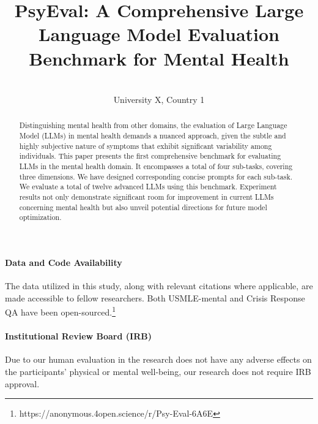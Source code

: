 \documentclass[pmlr,twocolumn,10pt]{jmlr} %
\title[PsyEval]{PsyEval: A Comprehensive Large Language Model\titlebreak
Evaluation Benchmark for Mental Health}
\author{
\Name{Anonymous First Author 1}\Email{abc@sample.com}\\
\addr University X, Country 1
}
\newcommand{\MY}[1]{\textcolor{blue}{(Mengyue: #1)}}
\begin{document}
\maketitle

\begin{abstract}
Distinguishing mental health from other domains, the evaluation of Large Language Model (LLMs) in mental health demands a nuanced approach, given the subtle and highly subjective nature of symptoms that exhibit significant variability among individuals. This paper presents the first comprehensive benchmark for evaluating LLMs in the mental health domain. 
It encompasses a total of four sub-tasks, covering three dimensions.
We have designed corresponding concise prompts for each sub-task. 
We evaluate a total of twelve advanced LLMs using this benchmark. 
Experiment results not only demonstrate significant room for improvement in current LLMs concerning mental health but also unveil potential directions for future model optimization.
\end{abstract}

\paragraph*{Data and Code Availability}
The data utilized in this study, along with relevant citations where applicable, are made accessible to fellow researchers. Both USMLE-mental and Crisis Response QA have been open-sourced.\footnote{https://anonymous.4open.science/r/Psy-Eval-6A6E}

\paragraph*{Institutional Review Board (IRB)}
Due to our human evaluation in the research does not have any adverse effects on the participants' physical or mental well-being, our research does not require IRB approval.







%
%


%

\appendix


\end{document}
